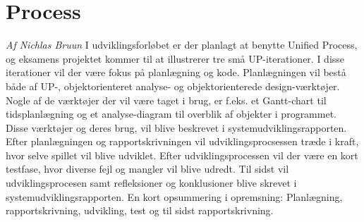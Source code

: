 \section{Process}
\textit{Af Nichlas Bruun}\newline
I udviklingsforløbet er der planlagt at benytte Unified Process, og eksamens projektet kommer til at illustrerer tre små UP-iterationer. 
I disse iterationer vil der være fokus på planlægning og kode. Planlægningen vil bestå både af UP-, objektorienteret analyse- og objektorienterede design-værktøjer. Nogle af de værktøjer der vil være taget i brug, er f.eks. et Gantt-chart til tidsplanlægning og et analyse-diagram til overblik af objekter i programmet. Disse værktøjer og deres brug, vil blive beskrevet i systemudviklingsrapporten. Efter planlægningen og rapportskrivningen vil udviklingsprocsessen træde i kraft, hvor selve spillet vil blive udviklet. Efter udviklingsprocessen vil der være en kort testfase, hvor diverse fejl og mangler vil blive udredt. Til sidst vil udviklingsprocesen samt refleksioner og konklusioner blive skrevet i systemudviklingsrapporten. En kort opsummering i opremsning: Planlægning, rapportskrivning, udvikling, test og til sidst rapportskrivning.
